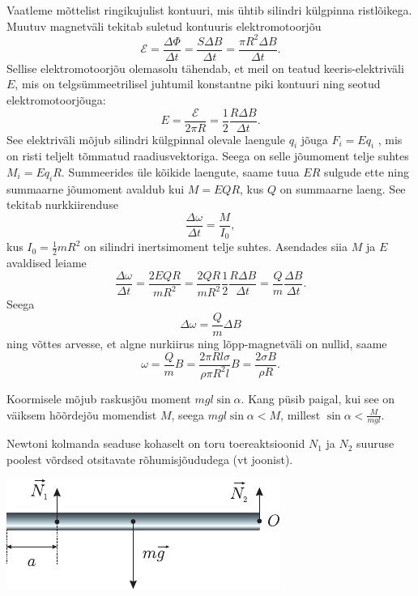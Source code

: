 \documentclass[10pt, twoside]{article}
\begin{document}
{%

\solu
Vaatleme mõttelist ringikujulist kontuuri, mis ühtib silindri külgpinna ristlõikega. Muutuv magnetväli tekitab suletud kontuuris elektromotoorjõu
\[
\mathcal{E}=\frac{\Delta \Phi}{\Delta t}=\frac{S \Delta B}{\Delta t}=\frac{\pi R^{2} \Delta B}{\Delta t}.
\]
Sellise elektromotoorjõu olemasolu tähendab, et meil on teatud keeris-elektriväli $E$, mis on telgsümmeetrilisel juhtumil konstantne piki kontuuri ning seotud elektromotoorjõuga:
\[
E=\frac{\mathcal{E}}{2 \pi R}=\frac{1}{2} \frac{R \Delta B}{\Delta t}.
\]
See elektriväli mõjub silindri külgpinnal olevale laengule $q_i$ jõuga $F_i = Eq_i$ , mis on risti teljelt tõmmatud raadiusvektoriga. Seega on selle jõumoment telje suhtes $M_i = Eq_iR$. Summeerides üle kõikide laengute, saame tuua $ER$ sulgude ette ning summaarne jõumoment avaldub kui $M = EQR$, kus $Q$ on summaarne laeng. See tekitab nurkkiirenduse
\[
\frac{\Delta \omega}{\Delta t}=\frac{M}{I_{0}},
\]
kus $I_0 = \frac{1}{2}mR^2$ on silindri inertsimoment telje suhtes. Asendades siia $M$ ja $E$ avaldised leiame
\[
\frac{\Delta \omega}{\Delta t}=\frac{2 E Q R}{m R^{2}}=\frac{2 Q R}{m R^{2}} \frac{1}{2} \frac{R \Delta B}{\Delta t}=\frac{Q}{m} \frac{\Delta B}{\Delta t}.
\]
Seega
\[
\Delta \omega=\frac{Q}{m} \Delta B
\]
ning võttes arvesse, et algne nurkiirus ning lõpp-magnetväli on nullid, saame
\[
\omega=\frac{Q}{m} B=\frac{2 \pi R l \sigma}{\rho \pi R^{2} l} B=\frac{2 \sigma B}{\rho R}.
\]
\probend
\bigskip


\solu
Koormisele mõjub raskusjõu moment $mgl\sin \alpha$. Kang püsib paigal, kui see on väiksem hõõrdejõu momendist $M$, seega $mgl\sin \alpha < M$, millest $\sin \alpha < \frac{M}{mgl}$.
\probend
\bigskip


\solu
Newtoni kolmanda seaduse kohaselt on toru toereaktsioonid $N_1$ ja $N_2$ suuruse poolest võrdsed otsitavate rõhumisjõududega (vt joonist).

\begin{center}
	\includegraphics[width=0.6\linewidth]{2007-lahg-02-lah}
\end{center}

}
\end{document}
